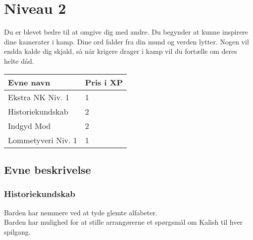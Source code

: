 \chapter*{Niveau 2}
Du er blevet bedre til at omgive dig med andre. Du begynder at kunne inspirere dine kamerater i kamp. Dine ord falder fra din mund og verden lytter. Nogen vil endda kalde dig skjald, så når krigere drager i kamp vil du fortælle om deres helte dåd.
\begin{table}[H]
    \centering
    \begin{tabular}{|p{}|p{}|}
    \rowcolor{cerulean!80}\hline
    Evne navn & Pris i XP \\\hline
       Ekstra NK Niv. 1 & 1 \\\hline
       Historiekundskab & 2 \\\hline
       Indgyd Mod & 2 \\\hline
       Lommetyveri Niv. 1 & 1 \\\hline
    \end{tabular}
\end{table}
\section*{Evne beskrivelse}



\subsection*{Historiekundskab}
Barden har nemmere ved at tyde glemte alfabeter.\\
Barden har mulighed for at stille arrangørerne et spørgsmål om Kalish til hver spilgang.





